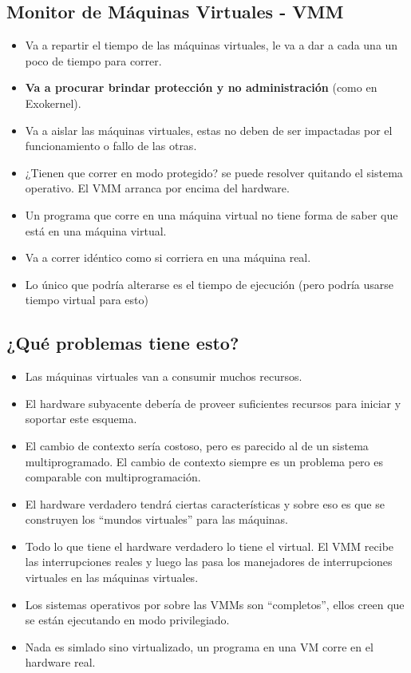 \documentclass[12pt, times]{simauth}
\begin{document}
\subsection{Monitor de Máquinas Virtuales - VMM}
\begin{itemize}
    \item Va a repartir el tiempo de las máquinas virtuales, le va a dar a cada una un poco de tiempo para correr.
    \item \textbf{Va a procurar brindar protección y no administración} (como en Exokernel). 
    \item Va a aislar las máquinas virtuales, estas no deben de ser impactadas por el funcionamiento o fallo de las otras.
    \item ¿Tienen que correr en modo protegido? se puede resolver quitando el sistema operativo. El VMM arranca por encima del hardware.
    \item Un programa que corre en una máquina virtual no tiene forma de saber que está en una máquina virtual.
    \item Va a correr idéntico como si corriera en una máquina real.
    \item Lo único que podría alterarse es el tiempo de ejecución (pero podría usarse tiempo virtual para esto)
\end{itemize}

\subsection{¿Qué problemas tiene esto?}
\begin{itemize}
    \item Las máquinas virtuales van a consumir muchos recursos.
    \item El hardware subyacente debería de proveer suficientes recursos para iniciar y soportar este esquema.
    \item El cambio de contexto sería costoso, pero es parecido al de un sistema multiprogramado. El cambio de contexto siempre es un problema pero es comparable con multiprogramación.
    \item El hardware verdadero tendrá ciertas características y sobre eso es que se construyen los ``mundos virtuales'' para las máquinas.
   \item Todo lo que tiene el hardware verdadero lo tiene el virtual. El VMM recibe las interrupciones reales y luego las pasa los manejadores de interrupciones virtuales en las máquinas virtuales.
   \item Los sistemas operativos por sobre las VMMs son ``completos'', ellos creen que se están ejecutando en modo privilegiado.
   \item Nada es simlado sino virtualizado, un programa en una VM corre en el hardware real.
\end{itemize}
\end{document}
